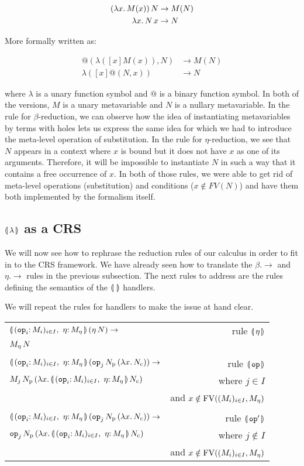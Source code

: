 \begin{align*}
  (\lambda x.\, M(x))\,N & \to M(N) \\
  \lambda x.\, N\,x & \to N
\end{align*}

More formally written as:

\begin{align*}
  @(\lambda([x]M(x)),N) & \to M(N) \\
  \lambda([x]@(N,x)) & \to N
\end{align*}

where $\lambda$ is a unary function symbol and $@$ is a binary function
symbol. In both of the versions, $M$ is a unary metavariable and $N$ is a
nullary metavariable. In the rule for $\beta$-reduction, we can observe how
the idea of instantiating metavariables by terms with holes lets us express
the same idea for which we had to introduce the meta-level operation of
substitution. In the rule for $\eta$-reduction, we see that $N$ appears in
a context where $x$ is bound but it does not have $x$ as one of its
arguments. Therefore, it will be impossible to instantiate $N$ in such a
way that it contains a free occurrence of $x$. In both of those rules, we
were able to get rid of meta-level operations (substitution) and conditions
($x \notin FV(N)$) and have them both implemented by the formalism itself.


\subsection{$\llparenthesis \, \lambda \, \rrparenthesis$ as a CRS}
\label{ssec:banana-as-crs}

We will now see how to rephrase the reduction rules of our calculus in
order to fit in to the CRS framework. We have already seen how to translate
the $\beta.\to$ and $\eta.\to$ rules in the previous subsection. The next
rules to address are the rules defining the semantics of the $\llparenthesis \,  \, \rrparenthesis$
handlers.

We will repeat the rules for handlers to make the issue at hand clear.

\begin{tabular}{lr}
  $\ap{\cibanana}{(\ap{\eta}{N})} \to$ & rule $\llparenthesis \, \eta \, \rrparenthesis$ \\
  $M_\eta\,N$ & \\
  \\
  $\ap{\cibanana}{(\ap{\ap{\op{op}_j}{N_{\mathrm{p}}}}{(\lam{x}{N_{\mathrm{c}}})})} \to$ & rule $\llparenthesis \, \mathtt{op} \, \rrparenthesis$ \\
  $\ap{M_j}{\ap{N_{\mathrm{p}}}{(\lam{x}{\ap{\cibanana}{N_{\mathrm{c}}}})}}$
  & where $j \in I$ \\
  & and $x \notin \operatorname{FV}((M_i)_{i \in I}, M_\eta)$ \\
  \\
  $\ap{\cibanana}{(\ap{\ap{\op{op}_j}{N_{\mathrm{p}}}}{(\lam{x}{N_{\mathrm{c}}})})} \to$ & rule $\llparenthesis \, \mathtt{op}' \, \rrparenthesis$ \\
  $\ap{\op{op}_j}{\ap{N_{\mathrm{p}}}{(\lam{x}{\ap{\cibanana}{N_{\mathrm{c}}}})}}$
  & where $j \notin I$ \\
  & and $x \notin \operatorname{FV}((M_i)_{i \in I}, M_\eta)$
\end{tabular}

